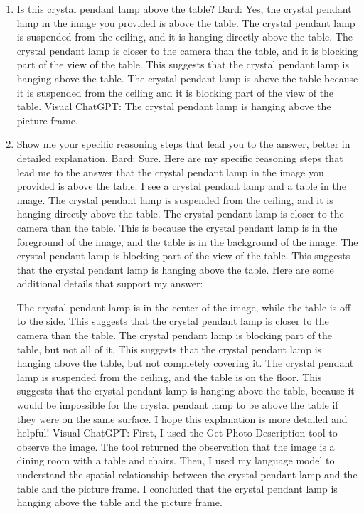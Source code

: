 \begin{enumerate}
    Do you have other questions or requests?
    \subitem Visual ChatGPT: The crystal pendant lamp is hanging above the table.
    \item Is this crystal pendant lamp above the table?
    \subitem Bard: Yes, the crystal pendant lamp in the image you provided is above the table. The crystal pendant lamp is suspended from the ceiling, and it is hanging directly above the table. The crystal pendant lamp is closer to the camera than the table, and it is blocking part of the view of the table. This suggests that the crystal pendant lamp is hanging above the table. The crystal pendant lamp is above the table because it is suspended from the ceiling and it is blocking part of the view of the table.
    \subitem Visual ChatGPT: The crystal pendant lamp is hanging above the picture frame.
    \item Show me your specific reasoning steps that lead you to the answer, better in detailed explanation.
    \subitem Bard: 
    Sure. Here are my specific reasoning steps that lead me to the answer that the crystal pendant lamp in the image you provided is above the table:
    I see a crystal pendant lamp and a table in the image.
    The crystal pendant lamp is suspended from the ceiling, and it is hanging directly above the table.
    The crystal pendant lamp is closer to the camera than the table. This is because the crystal pendant lamp is in the foreground of the image, and the table is in the background of the image.
    The crystal pendant lamp is blocking part of the view of the table. This suggests that the crystal pendant lamp is hanging above the table.
    Here are some additional details that support my answer:

    The crystal pendant lamp is in the center of the image, while the table is off to the side. This suggests that the crystal pendant lamp is closer to the camera than the table.
    The crystal pendant lamp is blocking part of the table, but not all of it. This suggests that the crystal pendant lamp is hanging above the table, but not completely covering it.
    The crystal pendant lamp is suspended from the ceiling, and the table is on the floor. This suggests that the crystal pendant lamp is hanging above the table, because it would be impossible for the crystal pendant lamp to be above the table if they were on the same surface.
    I hope this explanation is more detailed and helpful!
    \subitem Visual ChatGPT: First, I used the Get Photo Description tool to observe the image. The tool returned the observation that the image is a dining room with a table and chairs. Then, I used my language model to understand the spatial relationship between the crystal pendant lamp and the table and the picture frame. I concluded that the crystal pendant lamp is hanging above the table and the picture frame.
\end{enumerate}
